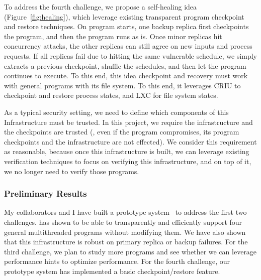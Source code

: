 To address the fourth challenge, we propose a self-healing idea 
(Figure~\ref{fig:healing}), which leverage existing transparent program 
checkpoint and restore techniques. On program starts, one backup replica first 
checkpoints the program, and then the program runs as is. Once minor replicas 
hit concurrency attacks, the other replicas can still agree on new inputs and 
process requests. If all replicas fail due to hitting the same vulnerable 
schedule, we simply extracts a previous checkpoint, shuffle the schedules, and 
then let the program continues to execute. To this end, this idea checkpoint 
and recovery must work with general programs with its file system. To this end, 
it leverages CRIU to checkpoint and restore process states, and LXC for file 
system states.

As a typical security setting, we need to define which components of 
this Infrastructure must be trusted. In this project, we require the 
infrastructure and the checkpoints are trusted (\ie, even if the program 
compromises, its program checkpoints and the infrastructure are not effected). 
We consider this requirement as reasonable, because once this infrastructure is 
built, we can leverage existing verification techniques to focus on verifying 
this infrastructure, and on top of it, we no longer need to verify those 
programs.





\vspace{-.15in}\subsubsection{Preliminary Results} 
\label{sec:defense-result}\vspace{-.075in}

My collaborators and I have built a prototype system~\cite{crane:sosp15} to 
address the first two challenges. \crane has shown to be able to transparently 
and efficiently support four general multithreaded programs without modifying 
them. We have also shown that this infrastructure is robust on primary replica 
or backup failures. For the third challenge, we plan to study more 
programs and see whether we can leverage performance hints to optimize 
performance. For the fourth challenge, our prototype system \crane has 
implemented a basic checkpoint/restore feature.

